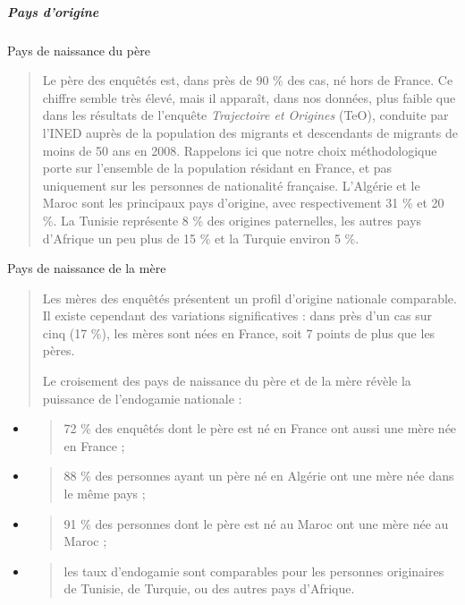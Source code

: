 \hypertarget{pays-dorigine}{%
\subparagraph{Pays d'origine}\label{pays-dorigine}}

Pays de naissance du père

\begin{quote}
Le père des enquêtés est, dans près de 90 \% des cas, né hors de France.
Ce chiffre semble très élevé, mais il apparaît, dans nos données, plus
faible que dans les résultats de l'enquête \emph{Trajectoire et
Origines} (TeO), conduite par l'INED auprès de la population des
migrants et descendants de migrants de moins de 50 ans en 2008.
Rappelons ici que notre choix méthodologique porte sur l'ensemble de la
population résidant en France, et pas uniquement sur les personnes de
nationalité française. L'Algérie et le Maroc sont les principaux pays
d'origine, avec respectivement 31 \% et 20 \%. La Tunisie représente 8
\% des origines paternelles, les autres pays d'Afrique un peu plus de 15
\% et la Turquie environ 5 \%.
\end{quote}

Pays de naissance de la mère

\begin{quote}
Les mères des enquêtés présentent un profil d'origine nationale
comparable. Il existe cependant des variations significatives : dans
près d'un cas sur cinq (17 \%), les mères sont nées en France, soit 7
points de plus que les pères.

Le croisement des pays de naissance du père et de la mère révèle la
puissance de l'endogamie nationale :
\end{quote}

\begin{itemize}
\item
  \begin{quote}
  72 \% des enquêtés dont le père est né en France ont aussi une mère
  née en France ;
  \end{quote}
\item
  \begin{quote}
  88 \% des personnes ayant un père né en Algérie ont une mère née dans
  le même pays ;
  \end{quote}
\item
  \begin{quote}
  91 \% des personnes dont le père est né au Maroc ont une mère née au
  Maroc ;
  \end{quote}
\item
  \begin{quote}
  les taux d'endogamie sont comparables pour les personnes originaires
  de Tunisie, de Turquie, ou des autres pays d'Afrique.
  \end{quote}
\end{itemize}

